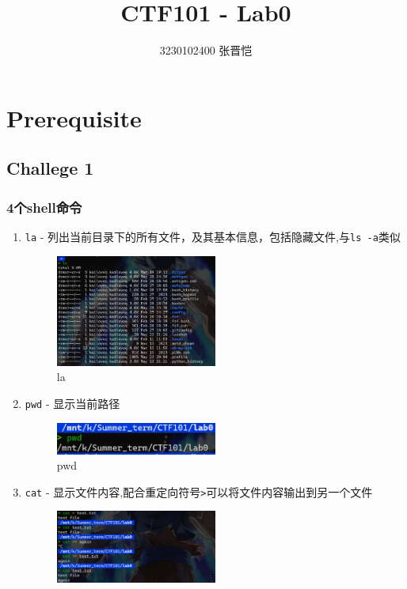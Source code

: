 \documentclass{article}
\title{CTF101 - Lab0}
\author{3230102400 张晋恺}
\begin{document}
\maketitle
     \section*{Prerequisite}
     \subsection*{Challege 1}
         \subsubsection*{4个shell命令}
            \begin{enumerate}
                \item \texttt{la} - 列出当前目录下的所有文件，及其基本信息，包括隐藏文件,与\texttt{ls -a}类似
                \begin{figure}[H]
                    \centering
                    \includegraphics[width=0.5\textwidth]{./figure/la.png}
                    \caption{la}
                \end{figure}
                \item \texttt{pwd} - 显示当前路径
                \begin{figure}[H]
                    \centering
                    \includegraphics[width=0.5\textwidth]{./figure/pwd.png}
                    \caption{pwd}
                \end{figure}
                \item \texttt{cat} - 显示文件内容,配合重定向符号\texttt{>}可以将文件内容输出到另一个文件
                \begin{figure}[H]
                    \centering
                    \includegraphics[width=0.5\textwidth]{./figure/cat.png}

\end{figure}
\end{enumerate}
\end{document}
